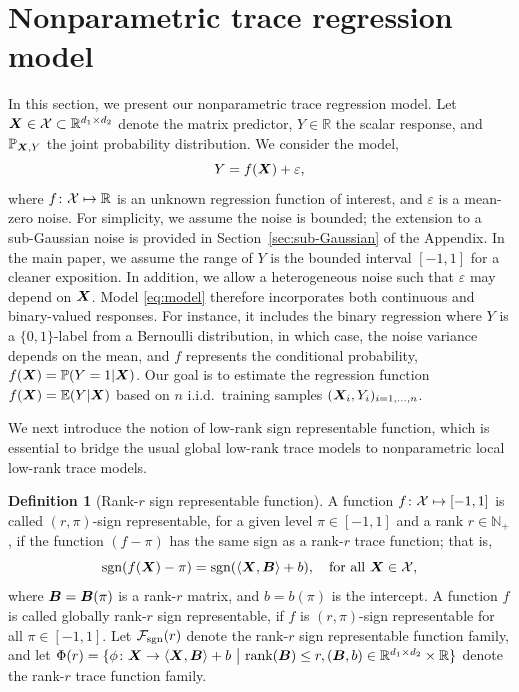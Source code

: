 \documentclass[aos]{imsart}
\theoremstyle{definition}
\newtheorem{definition}{Definition}
\def\sign{\textup{sgn}}
\def\caliF{\tF_{\textup{sgn}}}
\begin{document}
\section{Nonparametric trace regression model}
\label{sec:idea}

In this section, we present our nonparametric trace regression model. Let $\bm X\in\mathcal{X}\subset \mathbb{R}^{d_1\times d_2}$ denote the matrix predictor, $Y\in\mathbb{R}$ the scalar response, and $\mathbb{P}_{\bm X,Y}$ the joint probability distribution. We consider the model,
\begin{equation}\label{eq:model}
Y=f(\mX)+\varepsilon,
\end{equation}
where $f\colon\mathcal{X}\mapsto \mathbb{R}$ is an unknown regression function of interest, and $\varepsilon$ is a mean-zero noise. For simplicity, we assume the noise is bounded; the extension to a sub-Gaussian noise is provided in Section~\ref{sec:sub-Gaussian} of the Appendix. In the main paper, we assume the range of $Y$ is the bounded interval $[-1,1]$ for a cleaner exposition. In addition, we allow a heterogeneous noise such that $\varepsilon$ may depend on $\bm X$. Model \eqref{eq:model} therefore incorporates both continuous and binary-valued responses. For instance, it includes the binary regression where $Y$ is a $\{0,1\}$-label from a Bernoulli distribution, in which case, the noise variance depends on the mean, and $f$ represents the conditional probability, $f(\bm X)=\mathbb{P}(Y=1|\bm X)$. Our goal is to estimate the regression function $f(\bm X)=\mathbb{E}(Y|\bm X)$ based on $n$ i.i.d.\ training samples $(\bm X_i,Y_i)_{i=1,\ldots,n}$. 

We next introduce the notion of low-rank sign representable function, which is essential to bridge the usual global low-rank trace models to nonparametric local low-rank trace models. 

\begin{definition}[Rank-$r$ sign representable function] \label{def:caliF}
A function $f\colon \mathcal{X}\mapsto[-1,1]$ is called $(r,\pi)$-sign representable, for a given level $\pi\in[-1,1]$ and a rank $r \in \mathbb{N}_{+}$, if the function $(f-\pi)$ has the same sign as a rank-$r$ trace function; that is,
\begin{equation} \label{eq:sign}
\sign(f(\mX)-\pi) = \sign(\langle \mX, \mB \rangle+b),\quad \text{for all }\mX\in\tX,
\end{equation}
where $\bm B=\bm B(\pi)$ is a rank-$r$ matrix, and $b=b(\pi)$ is the intercept. A function $f$ is called globally rank-$r$ sign representable, if $f$ is $(r,\pi)$-sign representable for all $\pi\in[-1,1]$. Let $\caliF(r)$ denote the rank-$r$ sign representable function family, and let $\Phi(r)=\{\phi\colon \bm X\to \langle \bm X, \bm B \rangle+b\ \big|\ \text{rank}(\bm B)\leq r, (\bm B,b)\in\mathbb{R}^{d_1\times d_2}\times\mathbb{R}\}$ denote the rank-$r$ trace function family.
\end{definition}
\end{document}
